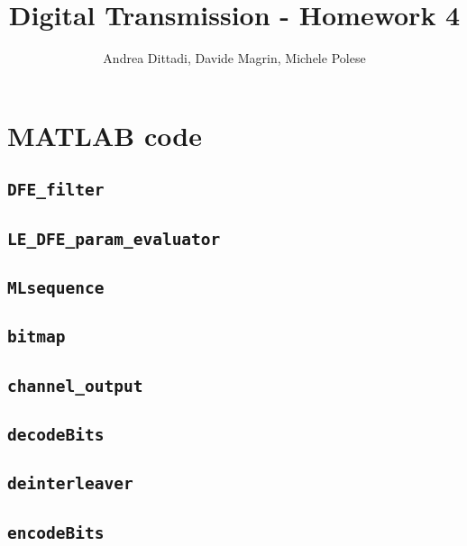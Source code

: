 \documentclass[10pt]{article}
\numberwithin{equation}{section}
\begin{document}
\title{Digital Transmission - Homework 4}
\author{Andrea Dittadi, Davide Magrin, Michele Polese}

\maketitle


\section*{MATLAB code}

\subsection*{\texttt{DFE\_filter}}


\subsection*{\texttt{LE\_DFE\_param\_evaluator}}


\subsection*{\texttt{MLsequence}}


\subsection*{\texttt{bitmap}}


\subsection*{\texttt{channel\_output}}


\subsection*{\texttt{decodeBits}}


\subsection*{\texttt{deinterleaver}}


\subsection*{\texttt{encodeBits}}

\end{document}
